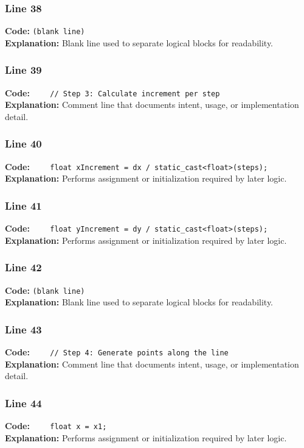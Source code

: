 \documentclass[11pt,a4paper]{article}
\begin{document}
\subsubsection*{Line 38}
\textbf{Code:} \texttt{(blank line)}\\
\textbf{Explanation:} Blank line used to separate logical blocks for readability.

\subsubsection*{Line 39}
\textbf{Code:} \verb|    // Step 3: Calculate increment per step|\\
\textbf{Explanation:} Comment line that documents intent, usage, or implementation detail.

\subsubsection*{Line 40}
\textbf{Code:} \verb|    float xIncrement = dx / static_cast<float>(steps);|\\
\textbf{Explanation:} Performs assignment or initialization required by later logic.

\subsubsection*{Line 41}
\textbf{Code:} \verb|    float yIncrement = dy / static_cast<float>(steps);|\\
\textbf{Explanation:} Performs assignment or initialization required by later logic.

\subsubsection*{Line 42}
\textbf{Code:} \texttt{(blank line)}\\
\textbf{Explanation:} Blank line used to separate logical blocks for readability.

\subsubsection*{Line 43}
\textbf{Code:} \verb|    // Step 4: Generate points along the line|\\
\textbf{Explanation:} Comment line that documents intent, usage, or implementation detail.

\subsubsection*{Line 44}
\textbf{Code:} \verb|    float x = x1;|\\
\textbf{Explanation:} Performs assignment or initialization required by later logic.
\end{document}
